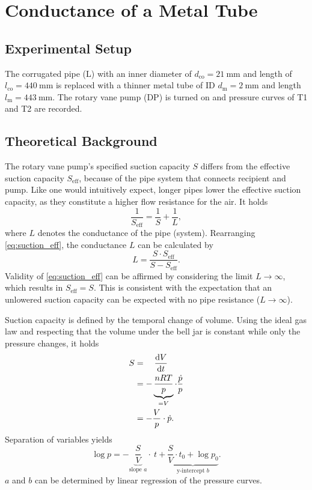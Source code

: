 \chapter{Conductance of a Metal Tube}\label{chap:con}
\section{Experimental Setup}
The corrugated pipe (L) with an inner diameter of $d_\text{co}=\SI{21}{\milli\meter}$ and length of $l_\text{co}=\SI{440}{\milli\meter}$ is replaced with a thinner metal tube of ID $d_\text{m}=\SI{2}{\milli\meter}$ and length $l_\text{m}=\SI{443}{\milli\meter}$.
The rotary vane pump (DP) is turned on and pressure curves of T1 and T2 are recorded.

\section{Theoretical Background}
The rotary vane pump's specified suction capacity $S$ differs from the effective suction capacity $S_\text{eff}$, because of the pipe system that connects recipient and pump.
Like one would intuitively expect, longer pipes lower the effective suction capacity, as they constitute a higher flow resistance for the air.
It holds
\begin{equation}\label{eq:suction_eff}
	\frac{1}{S_\text{eff}}=\frac{1}{S}+\frac{1}{L},
\end{equation}
where $L$ denotes the conductance of the pipe (system).
Rearranging \autoref{eq:suction_eff}, the conductance $L$ can be calculated by
\begin{equation}\label{eq:conductance}
	L=\frac{S\cdot S_\text{eff}}{S-S_\text{eff}}.
\end{equation}
Validity of \autoref{eq:suction_eff} can be affirmed by considering the limit $L\rightarrow\infty$, which results in $S_\text{eff}=S$.
This is consistent with the expectation that an unlowered suction capacity can be expected with no pipe resistance ($L\rightarrow\infty$).

Suction capacity is defined by the temporal change of volume. Using the ideal gas law and respecting that the volume under the bell jar is constant while only the pressure changes, it holds
\begin{align*}
	S &=\quad \frac{\text{d} V}{\text{d} t} \\
	&= -\underbrace{\frac{nRT}{p}}_{=V}\cdot\frac{\dot{p}}{p} \\
	&=-\frac{V}{p}\cdot\dot{p}.
\end{align*}
Separation of variables yields
\begin{equation}
	\log{p} = -\underbrace{\frac{S}{V}}_{\text{slope } a}\cdot\ t + \underbrace{\frac{S}{V}\cdot t_0 + \log{p_0}}_{\text{y-intercept } b}.
\end{equation}
$a$ and $b$ can be determined by linear regression of the pressure curves.

